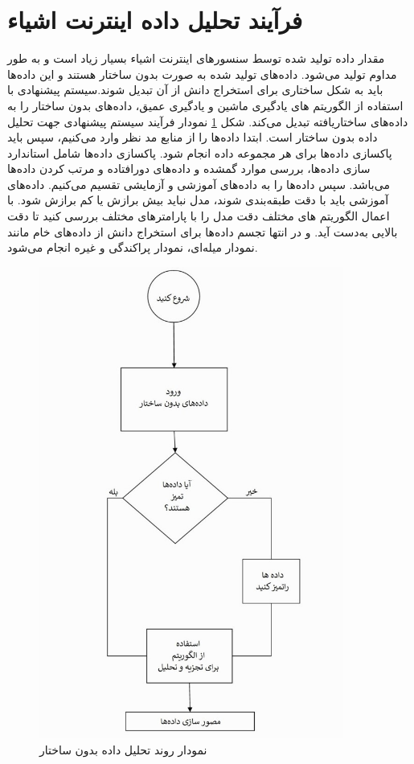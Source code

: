 \section{فرآیند تحلیل داده اینترنت اشیاء}
مقدار داده تولید شده توسط سنسورهای اینترنت اشیاء بسیار زیاد است و به طور مداوم تولید می‌شود. داده‌های تولید شده به صورت بدون ساختار هستند و این داده‌ها باید به شکل ساختاری برای استخراج دانش از آن تبدیل شوند.سیستم پیشنهادی با استفاده از الگوریتم های یادگیری ماشین و یادگیری عمیق، داده‌های بدون ساختار را به داده‌های ساختاریافته تبدیل می‌کند. شکل
\ref{flochart}
نمودار فرآیند سیستم پیشنهادی جهت تحلیل داده بدون ساختار است.
ابتدا داده‌ها را از منابع مد نظر وارد می‌کنیم،‌ سپس باید پاکسازی داده‌ها برای هر مجموعه‌ داده انجام شود. پاکسازی داده‌ها شامل استاندارد سازی داده‌ها، بررسی موارد گمشده و داده‌های دورافتاده و مرتب کردن داده‌ها می‌باشد. سپس داده‌ها را به داده‌های آموزشی و آزمایشی تقسیم می‌کنیم. داده‌های آموزشی باید با دقت طبقه‌بندی شوند، مدل نباید بیش برازش یا کم برازش شود. با اعمال الگوریتم های مختلف دقت مدل را با پارامترهای مختلف بررسی کنید تا دقت بالایی به‌دست آید. و در انتها تجسم داده‌ها برای استخراج دانش از داده‌های خام مانند نمودار میله‌ای، نمودار پراکندگی و غیره انجام می‌شود.

\begin{figure}[H]
	\centering
	\includegraphics[width=10cm]{flochart.jpg}
	\caption{نمودار روند تحلیل داده‌ بدون ساختار}
	\label{flochart}
\end{figure}

